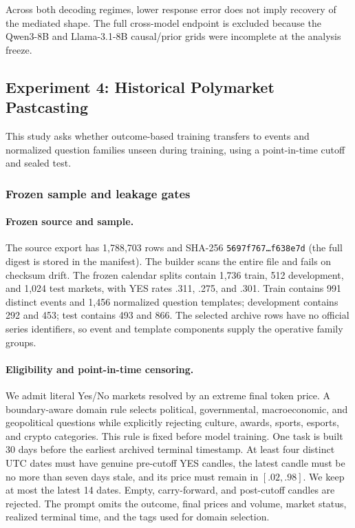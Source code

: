 Across both decoding regimes, lower response error does not imply recovery of the
mediated shape. The full cross-model endpoint is excluded because the Qwen3-8B and
Llama-3.1-8B causal/prior grids were incomplete at the analysis freeze.


\subsection{Experiment 4: Historical Polymarket Pastcasting}
\label{app:exp3b-protocol}

This study asks whether outcome-based training transfers to events and normalized
question families unseen during training, using a point-in-time cutoff and sealed
test.

\subsubsection{Frozen sample and leakage gates}

\paragraph{Frozen source and sample.}
The source export has 1,788,703 rows and SHA-256
\texttt{5697f767\ldots f638e7d} (the full digest is stored in the manifest).
The builder scans the entire file and fails on checksum drift. The frozen calendar
splits contain 1,736 train, 512 development, and 1,024 test markets, with YES rates
.311, .275, and .301. Train contains 991 distinct events and 1,456 normalized
question templates; development contains 292 and 453; test contains 493 and 866.
The selected archive rows have no official series identifiers, so event and
template components supply the operative family groups.

\paragraph{Eligibility and point-in-time censoring.}
We admit literal Yes/No markets resolved by an extreme final token price. A
boundary-aware domain rule selects political, governmental, macroeconomic, and
geopolitical questions while explicitly rejecting culture, awards, sports,
esports, and crypto categories. This rule is fixed before model training. One task
is built 30 days before the earliest archived terminal timestamp. At least four
distinct UTC dates must have genuine pre-cutoff YES candles, the latest candle must
be no more than seven days stale, and its price must remain in $[.02,.98]$. We keep
at most the latest 14 dates. Empty, carry-forward, and post-cutoff candles are
rejected. The prompt omits the outcome, final prices and volume, market status,
realized terminal time, and the tags used for domain selection.

